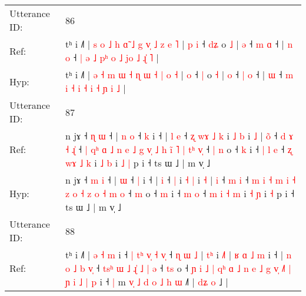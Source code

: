 \documentclass[10pt]{article}
\DeclareRobustCommand{\hl}[1]{{\textcolor{red}{#1}}}
\begin{document}
\begin{longtable}{ll}
 \\
\midrule
Utterance ID: & 86 \\
Ref: & tʰ i ˩˥ |\hl{ }\hl{s} \hl{o} \hl{˩} \hl{h} \hl{ɑ}\hl{̃} \hl{˩} \hl{g} \hl{v}\hl{̩} \hl{˩} \hl{z} \hl{e} \hl{˥} |\hl{ }\hl{p} \hl{i} ˧ \hl{d}\hl{ʑ} o \hl{˩} | \hl{ə} ˧ \hl{m} \hl{ɑ} ˧ |\hl{ }\hl{n} \hl{o} ˧ \hl{|} \hl{ə} \hl{˩} \hl{p}\hl{ʰ} \hl{o} \hl{˩} \hl{j}\hl{o} \hl{˩} \hl{ɻ}\hl{̍} \hl{˥} |
 \\
Hyp: & tʰ i ˩˥ |\hl{}\hl{} \hl{ə} \hl{˧} \hl{m} \hl{}\hl{ɯ} \hl{˧} \hl{ɳ} \hl{}\hl{ɯ} \hl{˧} \hl{|} \hl{o} \hl{˧} |\hl{}\hl{} \hl{o} ˧ \hl{}\hl{|} o \hl{˧} | \hl{o} ˧ \hl{|} \hl{o} ˧ |\hl{}\hl{} \hl{ɯ} ˧ \hl{m} \hl{i} \hl{˧} \hl{}\hl{i} \hl{˧} \hl{i} \hl{}\hl{˧} \hl{ɲ} \hl{}\hl{i} \hl{˩} |
 \\
\midrule
Utterance ID: & 87 \\
Ref: & n jɤ ˧ \hl{ɳ} \hl{ɯ} ˧ |\hl{ }\hl{n} \hl{o} ˧ \hl{k} i ˧ |\hl{ }\hl{l} \hl{e} ˧\hl{ }\hl{ʐ}\hl{ }\hl{w}\hl{ɤ}\hl{ }\hl{˩} \hl{k} i \hl{˩} \hl{b} i \hl{˩} | \hl{o}\hl{̃} ˧\hl{ }\hl{d}\hl{ }\hl{ɤ} \hl{˧} \hl{ɻ}\hl{̍} ˧\hl{ }\hl{|}\hl{ }\hl{q}\hl{ʰ} \hl{ɑ} \hl{˩} \hl{n} \hl{e} \hl{˩} \hl{g} \hl{v}\hl{̩} \hl{˩} \hl{h} \hl{i}\hl{̃} \hl{˥} \hl{|} \hl{t}\hl{ʰ} \hl{v}\hl{̩} ˧\hl{ }\hl{|} \hl{n} o ˧ \hl{k} i ˧\hl{ }\hl{|} \hl{l} \hl{e} ˧ \hl{ʐ} \hl{w}\hl{ɤ} \hl{˩} \hl{k} i \hl{˩} \hl{b} i\hl{ }\hl{˩} \hl{|} p i ˧ ts ɯ ˩ | m v̩ ˩
 \\
Hyp: & n jɤ ˧ \hl{m} \hl{i} ˧ |\hl{}\hl{} \hl{ɯ} ˧ \hl{|} i ˧ |\hl{}\hl{} \hl{i} ˧\hl{}\hl{}\hl{}\hl{}\hl{}\hl{}\hl{} \hl{|} i \hl{˧} \hl{|} i \hl{˧} | \hl{}\hl{i} ˧\hl{}\hl{}\hl{}\hl{} \hl{m} \hl{}\hl{i} ˧\hl{}\hl{}\hl{}\hl{}\hl{} \hl{m} \hl{i} \hl{˧} \hl{m} \hl{i} \hl{˧} \hl{}\hl{z} \hl{o} \hl{˧} \hl{}\hl{z} \hl{o} \hl{˧} \hl{}\hl{m} \hl{}\hl{o} ˧\hl{}\hl{} \hl{m} o ˧ \hl{m} i ˧\hl{}\hl{} \hl{m} \hl{o} ˧ \hl{m} \hl{}\hl{i} \hl{˧} \hl{m} i \hl{˧} \hl{ɲ} i\hl{}\hl{} \hl{˧} p i ˧ ts ɯ ˩ | m v̩ ˩
 \\
\midrule
Utterance ID: & 88 \\
Ref: & tʰ i ˩˥ |\hl{ }\hl{ə}\hl{ }\hl{˧}\hl{ }\hl{m} i ˧\hl{ }\hl{|}\hl{ }\hl{t}\hl{ʰ}\hl{ }\hl{v}\hl{̩} \hl{˧} \hl{v}\hl{̩} ˧ \hl{ɳ} \hl{ɯ} \hl{˩} |\hl{ }\hl{t}\hl{ʰ} i \hl{˩}\hl{˥} |\hl{ }\hl{ʁ}\hl{ }\hl{ɑ}\hl{ }\hl{˩}\hl{ }\hl{m} i ˧ |\hl{ }\hl{n} \hl{o} \hl{˩} \hl{b} \hl{v}\hl{̩} ˧\hl{ }\hl{t}\hl{s}\hl{ʰ}\hl{ }\hl{ɯ} \hl{˩} \hl{ɻ}\hl{̍} \hl{˩} \hl{|} \hl{ə} ˧ \hl{t}\hl{s} o ˧ \hl{ɲ} \hl{i} \hl{˩} \hl{|} \hl{q}\hl{ʰ} \hl{ɑ} \hl{˩} \hl{n} \hl{e} \hl{˩} \hl{g} \hl{v}\hl{̩} \hl{˩}\hl{˥} \hl{|} \hl{ɲ} \hl{i} \hl{˩} \hl{|} \hl{p} i ˧\hl{ }\hl{|} m\hl{ }\hl{v}\hl{̩}\hl{ }\hl{˩}\hl{ }\hl{d} \hl{o} \hl{˩} \hl{h} \hl{ɯ} ˩\hl{˥} | \hl{d}\hl{ʑ} \hl{o} ˩ |

\end{longtable}
\end{document}
